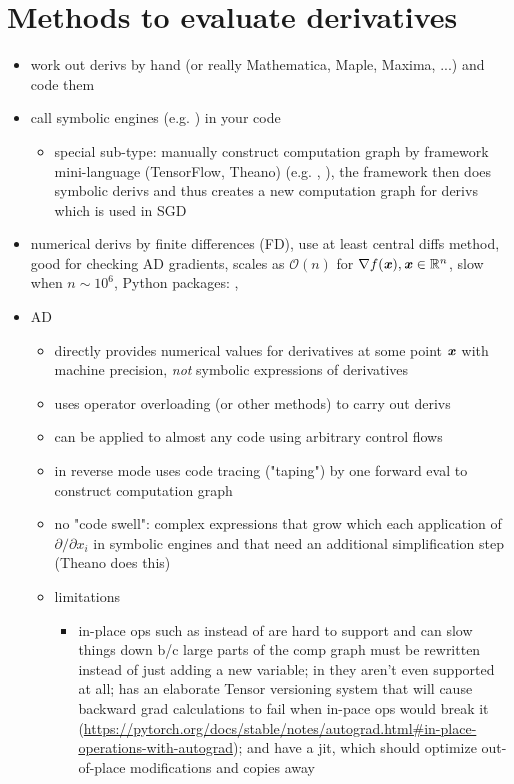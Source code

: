 \documentclass[paper=a4,11pt,headsepline]{scrartcl}
\begin{document}
\section{Methods to evaluate derivatives}

\begin{itemize}
    \item work out derivs by hand (or really Mathematica, Maple, Maxima, ...)
        and code them
    \item call symbolic engines (e.g. ) in your code
    \begin{itemize}
        \item special sub-type: manually construct computation graph by
            framework mini-language (TensorFlow, Theano) (e.g. ,
            ), the framework then does symbolic derivs and thus
            creates a new computation graph for derivs which is used in SGD
    \end{itemize}
\item numerical derivs by finite differences (FD), use at least central diffs method,
    good for checking AD gradients, scales as $\mathcal
    O(n)$ for $\nabla f(\bm{\mathit{x}}), \bm{\mathit{x}}\in\mathbb R^n$, slow when $n\sim 10^6$,
    Python packages: \numdifftools, \scipy
\item AD
    \begin{itemize}
        \item directly provides numerical values for derivatives at some point
            $\bm{\mathit{x}}$ with machine precision, \emph{not} symbolic expressions of
            derivatives
        \item uses operator overloading (or other methods) to carry out derivs
        \item can be applied to almost any code using arbitrary control flows
        \item in reverse mode uses code tracing ("taping") by one forward eval
            to construct computation graph
        \item no "code swell": complex expressions that grow which each
            application of $\partial/\partial x_i$ in symbolic engines and that
            need an additional simplification step (Theano does this)
        \item limitations
        \begin{itemize}
            \item in-place ops such as  instead of
                 are hard to support and can slow things down b/c
                large parts of the comp graph must be rewritten instead of just
                adding a new variable; in \autograd they aren't even supported
                at all;  \pytorch has an elaborate Tensor versioning system
                that will cause backward grad calculations to fail
                when in-pace ops would break it
                (\url{https://pytorch.org/docs/stable/notes/autograd.html#in-place-operations-with-autograd});
                \jax and \pytorch have a jit, which should optimize
                out-of-place modifications and copies away
        \end{itemize}
    \end{itemize}
\end{itemize}
%
\end{document}
